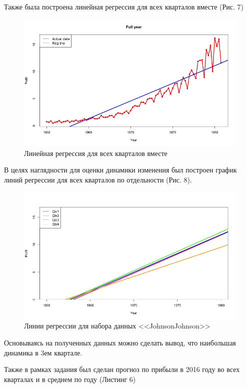\documentclass[]{article}
\numberwithin{equation}{section}
\begin{document}
    Также была построена линейная регрессия для всех кварталов вместе (Рис. 7)

    \begin{figure}[H]
        \centering
        \includegraphics[width = 0.9\linewidth]{data/JnJ_reg_line_full.png}
        \caption{Линейная регрессия для всех кварталов вместе}
    \end{figure}

    В целях наглядности для оценки динамики изменения был построен график линий регрессии для всех кварталов по отдельности (Рис. 8).

    \begin{figure}[H]
        \centering
        \includegraphics[width = 0.9\linewidth]{data/JnJ_reg_lines.png}
        \caption{Линии регрессии для набора данных <<JohnsonJohnson>>}
    \end{figure}

    Основываясь на полученных данных можно сделать вывод, что наибольшая динамика в 3ем квартале.

    Также в рамках задания был сделан прогноз по прибыли в 2016 году во всех кварталах и в среднем по году (Листинг 6)
\end{document}
